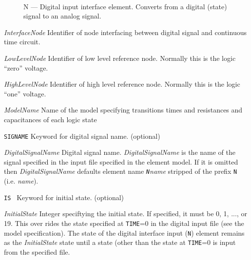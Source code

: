 
\begin{figure}[h]
\centering
\ 
\caption{N --- Digital input interface element. Converts from a digital (state)
signal to an analog signal.}
\end{figure}


\begin{widelist}
\item[{\it InterfaceNode}]
     Identifier of node interfacing between digital signal and
     continuous time circuit.
\item[{\it LowLevelNode}]
     Identifier of low level reference node. Normally this is the logic ``zero''
     voltage.
\item[{\it HighLevelNode}]
     Identifier of high level reference node. Normally this is the logic ``one''
     voltage.
\item[{\it ModelName}]
     Name of the model specifying transitions times and resistances and
     capacitances of each logic state
\item[{\tt SIGNAME}]
     Keyword for digital signal name. (optional)
\item[{\it DigitalSignalName}]
     Digital signal name.
     {\it DigitalSignalName} is the name of the signal specified in the
     input file specified in the element model.  If it is omitted then
     {\it DigitalSignalName} defaults element name {\it {\tt N}name}
     stripped of the prefix {\tt N} (i.e. {\it name}).
\item[{\tt IS }]
     Keyword for initial state. (optional)
\item[{\it InitialState}]
     Integer speciftying the initial state. If specified, it must be
     0, 1, ..., or 19. This over rides the state specified at {\tt TIME}=0
     in the digital input file (see the model specification).
     The state of the digital interface input ({\tt N}) element
     remains as the {\it InitialState} state until a state (other than the
     state at {\tt TIME}=0 is input from the specified file.
\end{widelist}



